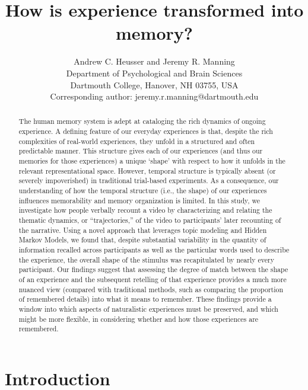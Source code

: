 \documentclass{article}
\title{How is experience transformed into memory?}
\author{Andrew C. Heusser and Jeremy R. Manning\\Department of Psychological and Brain Sciences\\Dartmouth College, Hanover, NH 03755, USA\\Corresponding author: jeremy.r.manning@dartmouth.edu}
\begin{document}
\maketitle

\begin{abstract}
The human memory system is adept at cataloging the rich dynamics of ongoing experience. A defining feature of our everyday experiences is that, despite the rich complexities of real-world experiences, they unfold in a structured and often predictable manner. This structure gives each of our experiences (and thus our memories for those experiences) a unique `shape' with respect to how it unfolds in the relevant representational space.  However, temporal structure is typically absent (or severely impoverished) in traditional trial-based  experiments. As a consequence, our understanding of how the temporal structure (i.e., the shape) of our experiences influences memorability and memory organization is limited. In this study, we investigate how people verbally recount a video by characterizing and relating the thematic dynamics, or ``trajectories,'' of the video to participants' later recounting of the narrative. Using a novel approach that leverages topic modeling and Hidden Markov Models, we found that, despite substantial variability in the quantity of information recalled across participants as well as the particular words used to describe the experience, the overall shape of the stimulus was recapitulated by nearly every participant. Our findings suggest that assessing the degree of match between the shape of an experience and the subsequent retelling of that experience provides a much more nuanced view (compared with traditional methods, such as comparing the proportion of remembered details) into what it means to remember. These findings provide a window into which aspects of naturalistic experiences must be preserved, and which might be more flexible, in considering whether and how those experiences are remembered.
\end{abstract}

\section*{Introduction}
\end{document}
